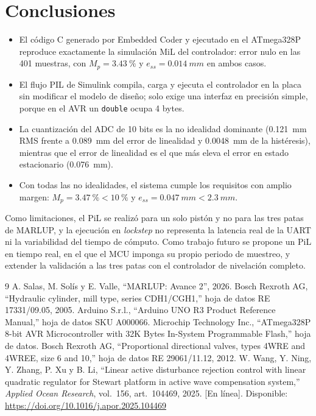 \documentclass[conference]{IEEEtran}
\begin{document}
\section{Conclusiones}
\label{sec:conclusiones}
\begin{itemize}
\item El código C generado por Embedded Coder y ejecutado en el ATmega328P reproduce exactamente la simulación MiL del controlador: error nulo en las 401 muestras, con $M_p=\SI{3.43}{\percent}$ y $e_{ss}=\SI{0.014}{mm}$ en ambos casos.
\item El flujo PIL de Simulink compila, carga y ejecuta el controlador en la placa sin modificar el modelo de diseño; solo exige una interfaz en precisión simple, porque en el AVR un \texttt{double} ocupa 4 bytes.
\item La cuantización del ADC de 10 bits es la no idealidad dominante (\SI{0.121}{mm} RMS frente a \SI{0.089}{mm} del error de linealidad y \SI{0.0048}{mm} de la histéresis), mientras que el error de linealidad es el que más eleva el error en estado estacionario (\SI{0.076}{mm}).
\item Con todas las no idealidades, el sistema cumple los requisitos con amplio margen: $M_p=\SI{3.47}{\percent}<\SI{10}{\percent}$ y $e_{ss}=\SI{0.047}{mm}<\SI{2.3}{mm}$.
\end{itemize}

Como limitaciones, el PiL se realizó para un solo pistón y no para las tres patas de MARLUP, y la ejecución en \textit{lockstep} no representa la latencia real de la UART ni la variabilidad del tiempo de cómputo. Como trabajo futuro se propone un PiL en tiempo real, en el que el MCU imponga su propio periodo de muestreo, y extender la validación a las tres patas con el controlador de nivelación completo.

\begin{thebibliography}{9}
 A. Salas, M. Solís y E. Valle, ``MARLUP: Avance 2'', 2026.
 Bosch Rexroth AG, ``Hydraulic cylinder, mill type, series CDH1/CGH1,'' hoja de datos RE 17331/09.05, 2005.
 Arduino S.r.l., ``Arduino UNO R3 Product Reference Manual,'' hoja de datos SKU A000066.
 Microchip Technology Inc., ``ATmega328P 8-bit AVR Microcontroller with 32K Bytes In-System Programmable Flash,'' hoja de datos.
 Bosch Rexroth AG, ``Proportional directional valves, types 4WRE and 4WREE, size 6 and 10,'' hoja de datos RE 29061/11.12, 2012.
 W. Wang, Y. Ning, Y. Zhang, P. Xu y B. Li, ``Linear active disturbance rejection control with linear quadratic regulator for Stewart platform in active wave compensation system,'' \textit{Applied Ocean Research}, vol.~156, art.~104469, 2025. [En línea]. Disponible: \url{https://doi.org/10.1016/j.apor.2025.104469}
\end{thebibliography}
\end{document}
